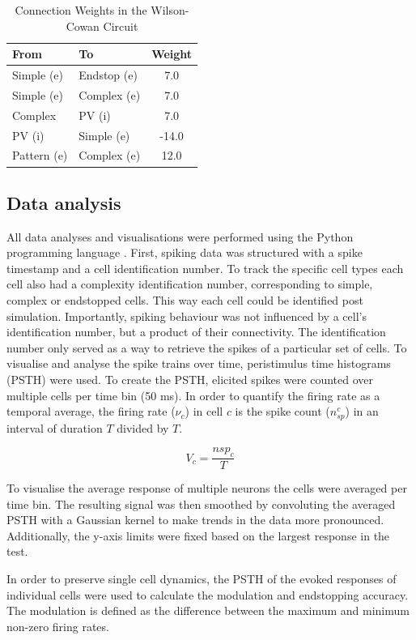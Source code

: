 \documentclass[12pt]{article}
\begin{document}
\begin{table}[h]
  \centering
  \caption{Connection Weights in the Wilson-Cowan Circuit}
  \label{tab:weights}
  \begin{tabular}{@{}llc@{}}
      \toprule
      \textbf{From} & \textbf{To} & \textbf{Weight} \\ \midrule
      Simple (e) & Endstop (e) & 7.0 \\
      Simple (e) & Complex (e) & 7.0 \\
      Complex & PV (i) & 7.0 \\
      PV (i) & Simple (e) & -14.0 \\
      Pattern (e) & Complex (e) & 12.0 \\ \bottomrule
  \end{tabular}
\end{table}

\subsection*{Data analysis}
All data analyses and visualisations were performed using the Python programming language \autocite{vanrossumPythonTutorial1995}. First, spiking data was structured with a spike timestamp and a cell identification number. To track the specific cell types each cell also had a complexity identification number, corresponding to simple, complex or endstopped cells. This way each cell could be identified post simulation. Importantly, spiking behaviour was not influenced by a cell's identification number, but a product of their connectivity. The identification number only served as a way to retrieve the spikes of a particular set of cells. To visualise and analyse the spike trains over time, peristimulus time histograms (PSTH) were used. To create the PSTH, elicited spikes were counted over multiple cells per time bin (50 ms). In order to quantify the firing rate as a temporal average, the firing rate ($\nu_c$) in cell $c$ is the spike count ($n_{sp}^c$) in an interval of duration $T$ divided by $T$.

\[
V_c = \frac{nsp_c}{T}
\]

To visualise the average response of multiple neurons the cells were averaged per time bin. The resulting signal was then smoothed by convoluting the averaged PSTH with a Gaussian kernel to make trends in the data more pronounced. Additionally, the y-axis limits were fixed based on the largest response in the test.

In order to preserve single cell dynamics, the PSTH of the evoked responses of individual cells were used to calculate the modulation and endstopping accuracy. The modulation is defined as the difference between the maximum and minimum non-zero firing rates. 
\end{document}
